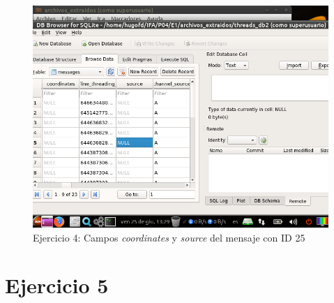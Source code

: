 \documentclass[11pt]{article}
\begin{document}
\begin{figure}[H]
    \caption{Ejercicio 4: Campos \textit{coordinates} y \textit{source} del mensaje con ID 25}
    \centering
    \includegraphics[scale=0.7]{e4-7.png}
\end{figure}

\section{Ejercicio 5}



\begin{thebibliography}{8}
\end{thebibliography}
\end{document}

